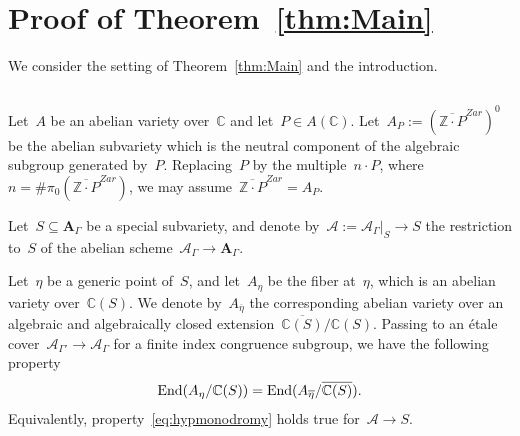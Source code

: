 \documentclass[12pt]{amsart}
\newcommand{\Hom}{\mbox{Hom}}
\newcommand{\End}{{\rm End}}
\newcommand{\Z}{{\mathbb Z}}
\newcommand{\C}{{\mathbb C}}
\newcommand{\ol}{\overline}
\begin{document}
%
%



\section{Proof of Theorem~\ref{thm:Main}}\label{sec:proof}

We consider the setting of Theorem~\ref{thm:Main} and the introduction. 
\subsection{}\label{sec:51}
Let~$A$ be an abelian variety over~$\C$ and let~$P\in A(\C)$. Let~$A_P:=(\ol{\Z\cdot P}^{Zar})^0$ be the abelian subvariety which is the neutral component of the algebraic subgroup generated by~$P$. Replacing~$P$ by the multiple~$n\cdot P$, where~$n=\#\pi_0(\ol{\Z\cdot P}^{Zar})$, we may assume~$\ol{\Z\cdot P}^{Zar}=A_P$.

Let~$S\subseteq \mathbf{A}_\Gamma$ be a special subvariety, and denote by~$\mathcal{A}:=\mathcal{A}_\Gamma|_S\to S$ the restriction to~$S$ of the abelian scheme~$\mathcal{A}_\Gamma\to\mathbf{A}_\Gamma$. 

Let~$\eta$ be a generic point of~$S$, and let~$A_\eta$ be the fiber at~$\eta$, which is an abelian variety over~$\C(S)$. We denote by~$A_{\ol{\eta}}$ the corresponding abelian variety over an algebraic and algebraically closed extension~$\ol{\C(S)}/\C(S)$. Passing to an étale cover~$\mathcal{A}_{\Gamma'}\to\mathcal{A}_{\Gamma}$ for a finite index congruence subgroup,
we have the following property
\begin{equation}
\End(A_\eta/\C(S))=\End(A_{\ol{\eta}}/\ol{\C(S)}).
\end{equation}
Equivalently, property~\eqref{eq:hypmonodromy} holds true for~$\mathcal{A}\to S$.
\end{document}
